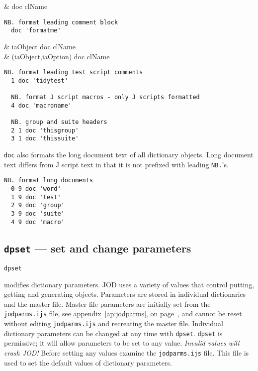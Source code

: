 \begin{wordhead}
\monad & doc clName \\
\end{wordhead}
\begin{lstlisting}[frame=single,framerule=0pt]
  NB. format leading comment block 
  doc 'formatme' 
\end{lstlisting}

\begin{wordhead}
\dyad & iaObject doc clName  \\
      & (iaObject,iaOption) doc clName \\
\end{wordhead}
\begin{lstlisting}[frame=single,framerule=0pt]
  NB. format leading test script comments
  1 doc 'tidytest'
  
  NB. format J script macros - only J scripts formatted
  4 doc 'macroname'
  
  NB. group and suite headers
  2 1 doc 'thisgroup'
  3 1 doc 'thissuite'
\end{lstlisting} 
  
\texttt{doc} also formats the long document text of all dictionary objects.
Long document text differs from J script
text in that it is not prefixed with leading \verb|NB.|'s.
  
\begin{lstlisting}[frame=single,framerule=0pt]
  NB. format long documents
  0 9 doc 'word'
  1 9 doc 'test'
  2 9 doc 'group'
  3 9 doc 'suite'
  4 9 doc 'macro'
\end{lstlisting}  


\subsection{\texttt{dpset} --- set and change parameters}\label{ss:dpset}

\hypertarget{il:dpset}{\texttt{dpset}} modifies dictionary parameters. JOD uses a 
variety of values that control putting, getting and generating objects. 
Parameters are stored in individual dictionaries and 
the master file. Master file parameters are initially 
set from the \verb|jodparms.ijs| file, see appendix~\ref{ap:jodparms}, on
page~\pageref{ap:jodparms}, and cannot be reset without 
editing \verb|jodparms.ijs| and recreating the master file. Individual 
dictionary parameters can be changed at any time with \texttt{dpset}. \texttt{dpset} is permissive; 
it will allow parameters to be set to any value. \emph{Invalid values will 
crash JOD!} Before setting any values examine the \verb|jodparms.ijs| file. 
This file is used to set the default values of dictionary parameters. 

